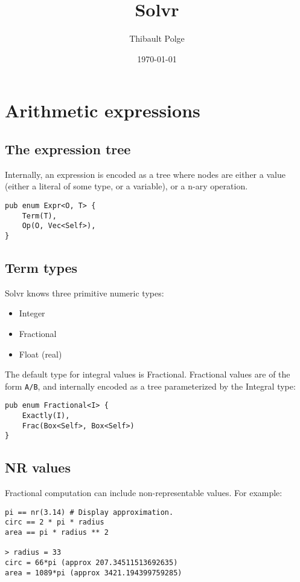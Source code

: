 \documentclass[11pt]{article}
\title{Solvr}
\author{Thibault Polge}
\date{\today}
\begin{document}
\maketitle

\section{Arithmetic expressions}
\label{sec:org2a8643b}

\subsection{The expression tree}
\label{sec:orgb0147b1}

Internally, an expression is encoded as a tree where nodes are either
a value (either a literal of some type, or a variable), or a n-ary
operation.

\begin{verbatim}
pub enum Expr<O, T> {
    Term(T),
    Op(O, Vec<Self>),
}
\end{verbatim}

\subsection{Term types}

Solvr knows three primitive numeric types:

\begin{itemize}
\item Integer
\item Fractional
\item Float (real)
\end{itemize}

The default type for integral values is Fractional.  Fractional values
are of the form \texttt{A/B}, and internally encoded as a tree parameterized
by the Integral type:

\begin{verbatim}
pub enum Fractional<I> {
    Exactly(I),
    Frac(Box<Self>, Box<Self>)
}
\end{verbatim}

\subsection{NR values}

Fractional computation can include non-representable values.  For
example:

\begin{verbatim}
pi == nr(3.14) # Display approximation.
circ == 2 * pi * radius
area == pi * radius ** 2

> radius = 33
circ = 66*pi (approx 207.34511513692635)
area = 1089*pi (approx 3421.194399759285)
\end{verbatim}
\end{document}
